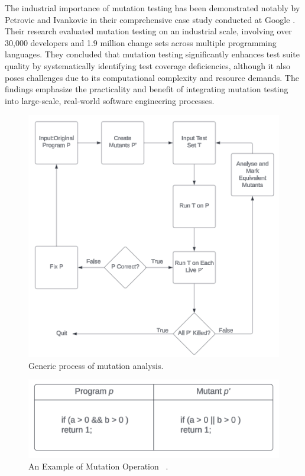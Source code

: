 The industrial importance of mutation testing has been demonstrated notably by Petrovic and Ivankovic in their comprehensive case study conducted at Google \cite{petrovic2018industrial}. Their research evaluated mutation testing on an industrial scale, involving over 30,000 developers and 1.9 million change sets across multiple programming languages. They concluded that mutation testing significantly enhances test suite quality by systematically identifying test coverage deficiencies, although it also poses challenges due to its computational complexity and resource demands. The findings emphasize the practicality and benefit of integrating mutation testing into large-scale, real-world software engineering processes.

\begin{figure}[!htbp]
    \centering
    \includegraphics[width=\linewidth]{images/MutationProcess.png}
    \caption{Generic process of mutation analysis.~\cite{offutt2010mutation}}
    \label{fig:MutationAnalysis}
\end{figure}

\begin{figure}[!htbp]
    \centering
    \includegraphics[width=\linewidth]{images/MutationOperation.png}
    \caption{An Example of Mutation Operation ~\cite{offutt2010mutation}.}
    \label{fig:MutationOperation}
\end{figure}

